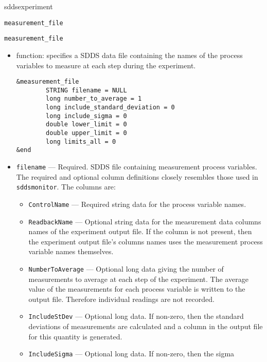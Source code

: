 \begin{sddsprog}{sddsexperiment}
\begin{itemize}
\begin{latexonly}
\newpage\begin{center}{\Large \verb+measurement_file+}\end{center}
\end{latexonly}
\begin{htmlonly}
  \item {\Large \verb+measurement_file+}
\end{htmlonly}
  \begin{itemize}
    \item function: specifies a SDDS data file containing the names of
                 the process variables to measure at each step during the experiment.
\begin{verbatim}
&measurement_file
        STRING filename = NULL
        long number_to_average = 1
        long include_standard_deviation = 0
        long include_sigma = 0
        double lower_limit = 0
        double upper_limit = 0
        long limits_all = 0
&end
\end{verbatim}
    \item {\verb+filename+} --- Required. SDDS file containing measurement process variables.
                The required and optional column definitions closely resembles those used in {\verb+sddsmonitor+}.
                The columns are:
    \begin{itemize}
      \item {\verb+ControlName+} --- Required string data for the process variable names.
      \item {\verb+ReadbackName+} --- Optional string data for the measurement data
                columns names of the experiment output file. If the column is not present, then the
                experiment output file's columns names uses the measurement process variable names themselves.
      \item {\verb+NumberToAverage+} --- Optional long data giving the number of measurements
                to average at each step of the experiment. The average value of the measurements for each
                process variable is written to the output file. Therefore individual readings are not recorded.
      \item {\verb+IncludeStDev+} --- Optional long data. If non-zero, then the standard
                deviations of measurements are calculated and a column in the output file for this quantity
                is generated.
      \item {\verb+IncludeSigma+} --- Optional long data.  If non-zero, then the sigma

\end{itemize}
\end{itemize}
\end{itemize}
\end{sddsprog}
